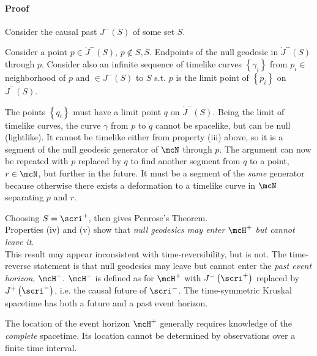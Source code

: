 \paragraph{Proof} Consider the causal past $J^-(S)$ of some set $S$.
\begin{center}\end{center}
Consider a point $p\in\dot{J}^-(S)$, $p\not\in S,\overline{S}$.
  Endpoints of the null geodesic in $\dot{J}^-(S)$ through $p$.  
Consider also an infinite sequence of timelike curves 
$\left\{\gamma_i\right\}$ from $p_i\in$ neighborhood of $p$ and 
$\in J^-(S)$ to
$S$
s.t. $p$ is the limit point of $\left\{p_i\right\}$ on $\dot{J}^-(S)$.
\begin{center}\end{center}
The points $\left\{q_i\right\}$ must have a limit point $q$ on $\dot{J}^-(S)$.
Being the limit of timelike curves, the curve $\gamma$ from $p$ to $q$ 
cannot be spacelike, but can be null (lightlike).  It cannot be timelike either
from property (iii) above, so it is a segment of the null geodesic generator of
$\mcN$
through $p$.  The argument can now be repeated with $p$ replaced by $q$ to 
find another segment from $q$ to a point, 
$r\in\mcN$, but further in the future.  It must be a segment of the 
\emph{same} generator because otherwise there exists a deformation to a timelike
curve in $\mcN$ separating $p$ and $r$.
\begin{center}\end{center}
Choosing $S=\scri^+$, then gives Penrose's Theorem. \\

Properties (iv) and (v) show that \emph{null geodesics may enter $\mcH^+$ 
but cannot leave it}. \\

This result may appear inconsistent with time-reversibility, but is not.  
The time-reverse statement is that null geodesics may leave but cannot enter the
\emph{past event horizon}, $\mcH^-$.  $\mcH^-$ is defined as for $\mcH^+$ with
$J^-\left(\scri^+\right)$ replaced by $J^+\left(\scri^-\right)$, i.e. the causal
future of $\scri^-$.  The time-symmetric Kruskal spacetime has both a future and
a past event horizon.
\begin{center}\end{center}
The location of the event horizon $\mcH^+$ generally requires knowledge of the 
\emph{complete} spacetime.  Its location cannot be determined by observations
over a finite time interval. \\

